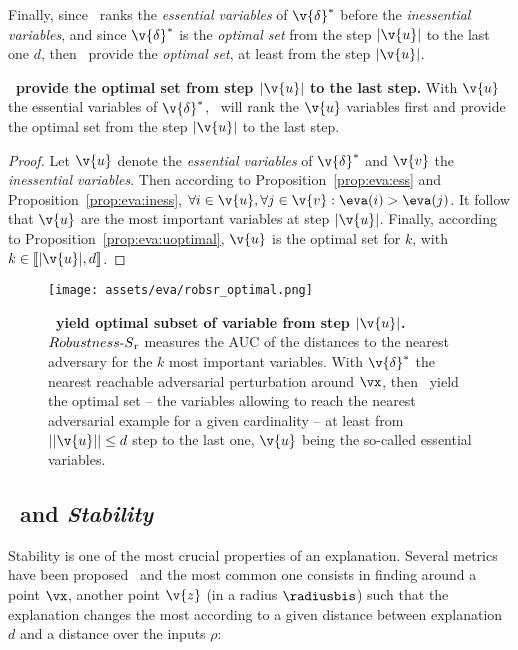 Finally, since \eva~ranks the \textit{essential variables} of $\v{\delta}^*$ before the \textit{inessential variables}, and since $\v{\delta}^*$ is the \textit{optimal set} from the step $|\v{u}|$ to the last one $d$, then \eva~provide the \textit{optimal set}, at least from the step $|\v{u}|$.

\begin{theorem}\textbf{\eva~provide the optimal set from step $|\v{u}|$ to the last step.}
\label{app:eva:rsr}
With $\v{u}$ the essential variables of $\v{\delta}^*$, \eva~will rank the $\v{u}$ variables first and provide the optimal set from the step $|\v{u}|$ to the last step. 
\end{theorem}

\begin{proof}
Let $\v{u}$ denote the \textit{essential variables} of $\v{\delta}^*$ and $\v{v}$ the \textit{inessential variables}. Then according to Proposition~\ref{prop:eva:ess} and Proposition~\ref{prop:eva:iness}, $\forall i \in \v{u}, \forall j \in \v{v}: \eva(i) > \eva(j)$. It follow that $\v{u}$ are the most important variables at step $|\v{u}|$. Finally, according to Proposition~\ref{prop:eva:uoptimal}, $\v{u}$ is the optimal set for $k$, with $k \in [\![|\v{u}|,d]\!]$.
\end{proof}

\begin{figure}[ht]
  \centering
  \texttt{[image: assets/eva/robsr\_optimal.png]}
  \caption{\textbf{\eva~yield optimal subset of variable from step $|\v{u}|$.} ${Robustness\text{-}S\textsubscript{r}}$ measures the AUC of the distances to the nearest adversary for the $k$ most important variables. With $\v{\delta}^*$ the nearest reachable adversarial perturbation around $\vx$, then \eva~yield the optimal set -- the variables allowing to reach the nearest adversarial example for a given cardinality -- at least from $||\v{u}|| \leq d$ step to the last one, $\v{u}$ being the so-called essential variables.
  }
  \label{fig:eva:eva_optimal}
\end{figure}


\subsection{\eva~and \textit{Stability}}

Stability is one of the most crucial properties of an explanation. Several metrics have been proposed~\cite{aggregating2020,yeh2019infidelity} and the most common one consists in finding around a point $\vx$, another point $\v{z}$ (in a radius $\radiusbis$) such that the explanation changes the most according to a given distance between explanation $d$ and a distance over the inputs $\rho$:

